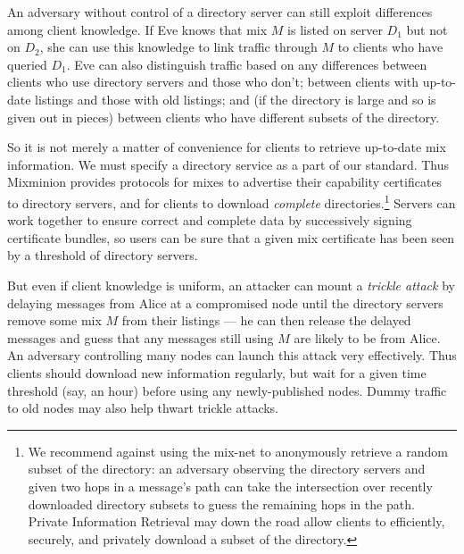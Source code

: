 \documentclass[11pt]{IEEEtran}
\begin{document}
An adversary without control of a directory server can still exploit
differences among client knowledge. If Eve knows that mix $M$ is listed
on server $D_1$ but not on $D_2$, she can use this knowledge to link
traffic through $M$ to clients who have queried $D_1$.  Eve can also
distinguish traffic based on any differences between clients who use
directory servers and those who don't; between clients with up-to-date
listings and those with old listings; and (if the directory is large
and so is given out in pieces) between clients who have different subsets
of the directory.

So it is not merely a matter of convenience for clients to retrieve
up-to-date mix information.
We must specify a directory
service as a part of our standard. Thus Mixminion provides protocols for
mixes to advertise their capability certificates to directory servers,
and for clients to download \emph{complete} directories.\footnote{
  We recommend against using the mix-net to anonymously retrieve a random
  subset of the directory: an adversary observing the directory servers
  and given two hops in a message's path can take the intersection over
  recently downloaded directory subsets to guess the remaining hops in
  the path. Private Information Retrieval \cite{malkin-thesis} may down
  the road allow clients to efficiently, securely, and privately download
  a subset of the directory.
}
Servers can work together to ensure correct and complete data by
successively signing certificate bundles, so users can be sure that a
given mix certificate has been seen by a threshold of directory servers.

But even if client knowledge is uniform, an attacker can mount a
\emph{trickle attack} by delaying messages from Alice at a compromised
node until the directory servers remove some mix $M$ from their listings
--- he can then release the delayed messages and guess that any messages
still using $M$ are likely to be from Alice. An adversary controlling
many nodes can launch this attack very effectively. Thus clients
should download new information regularly,
but wait for a given time threshold (say, an hour) before using any
newly-published nodes. Dummy traffic to old nodes may also 
help thwart trickle attacks.
\end{document}
